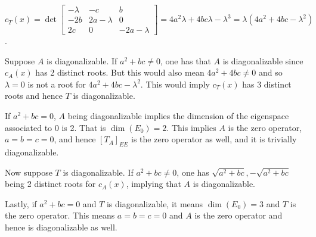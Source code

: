 \documentclass{article}
\begin{document}
\begin{enumerate}[label=(\alph*)]
    $c_T(x)=\det\begin{bmatrix} 
    -\lambda & -c & b\\
    -2b & 2a-\lambda& 0\\
    2c & 0 & -2a-\lambda
    \end{bmatrix}=4a^2\lambda + 4bc\lambda - \lambda^3=\lambda(4a^2+4bc-\lambda^2)$.
    
    Suppose $A$ is diagonalizable. If $a^2+bc \neq 0$, one has that $A$ is diagonalizable since $c_A(x)$ has 2 distinct roots. But this would also mean $4a^2+4bc \neq 0$ and so $\lambda =0$ is not a root for $4a^2+4bc-\lambda^2$. This would imply $c_T(x)$ has 3 distinct roots and hence $T$ is diagonalizable. 
    
    If $a^2+bc=0$, $A$ being diagonalizable implies the dimension of the eigenspace associated to $0$ is 2. That is $\dim(E_0)=2$. This implies $A$ is the zero operator, $a=b=c=0$, and hence $[T_A]_{EE}$ is the zero operator as well, and it is trivially diagonalizable.
    
    Now suppose $T$ is diagonalizable. If $a^2+bc \neq 0$, one has $\sqrt{a^2+bc}, -\sqrt{a^2+bc}$ being 2 distinct roots for $c_A(x)$, implying that $A$ is diagonalizable.
    
    Lastly, if $a^2+bc= 0$ and $T$ is diagonalizable, it means $\dim(E_0)=3$ and $T$ is the zero operator. This means $a=b=c=0$ and $A$ is the zero operator and hence is diagonalizable as well.
\end{enumerate}
\end{document}
